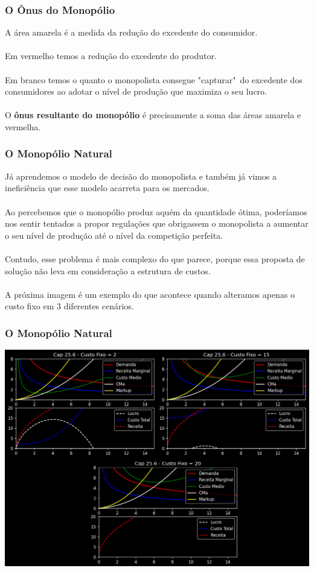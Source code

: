\documentclass{beamer}[10]
\begin{document}
\begin{frame}
	\frametitle{O Ônus do Monopólio}
	
	A área amarela é a medida da redução do excedente do consumidor.
	\\~\\
	Em vermelho temos a redução do excedente do produtor.
	\\~\\
	Em branco temos o quanto o monopolista consegue "capturar"\ do excedente dos consumidores ao adotar o nível de produção que maximiza o seu lucro.
	\\~\\
	O \textbf{ônus resultante do monopólio} é precisamente a soma das áreas amarela e vermelha.
\end{frame}


\begin{frame}
	\frametitle{O Monopólio Natural}

	Já aprendemos o modelo de decisão do monopolista e também já vimos a ineficiência que esse modelo acarreta para os mercados.
	\\~\\
	Ao percebemos que o monopólio produz aquém da quantidade ótima, poderíamos nos sentir tentados a propor regulações que obrigassem o monopolista a aumentar o seu nível de produção até o nível da competição perfeita.
	\\~\\
	Contudo, esse problema é mais complexo do que parece, porque essa proposta de solução não leva em consideração a estrutura de custos.
	\\~\\
	A próxima imagem é um exemplo do que acontece quando alteramos apenas o custo fixo em 3 diferentes cenários.
\end{frame}

\begin{frame}
	\frametitle{O Monopólio Natural}
	\begin{center}
		\includegraphics[scale=0.3]{cap25_6-monopolio_natural.png}
		\end{center}
\end{frame}
\end{document}
